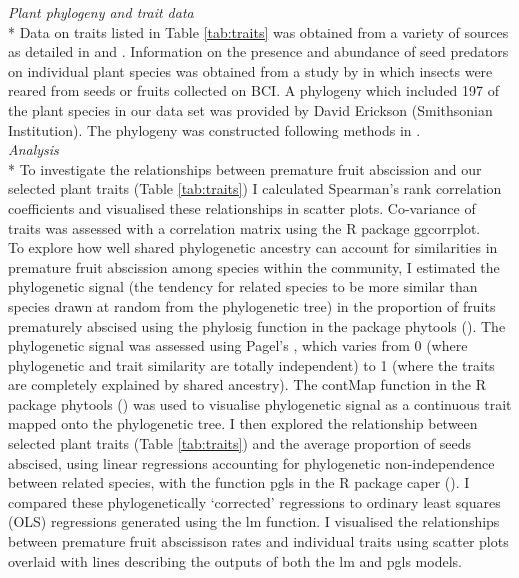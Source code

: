 \emph{Plant phylogeny and trait data}\\*
Data on traits listed in Table \ref{tab:traits} was obtained from a variety of sources as detailed in \cite{gripenbergHighlyResolvedFood2019} and \cite{wrightFunctionalTraitsGrowth2010}. Information on the presence and abundance of seed predators on individual plant species was obtained from a study by \cite{gripenbergHighlyResolvedFood2019} in which insects were reared from seeds or fruits collected on BCI. A phylogeny which included 197 of the plant species in our data set was provided by David Erickson (Smithsonian Institution).  The phylogeny was constructed following methods in \cite{kressPlantDNABarcodes2009}. \\

\emph{Analysis}\\*
To investigate the relationships between premature fruit abscission and our selected plant traits (Table \ref{tab:traits}) I calculated Spearman’s rank correlation coefficients and visualised these relationships in scatter plots. Co-variance of traits was assessed with a correlation matrix using the R package ggcorrplot.\\

To explore how well shared phylogenetic ancestry can account for similarities in premature fruit abscission among species within the community, I estimated the phylogenetic signal (the tendency for related species to be more similar than species drawn at random from the phylogenetic tree) in the proportion of fruits prematurely abscised using the phylosig function in the package phytools (\cite{revellPhytoolsPhylogeneticTools2020}). The phylogenetic signal was assessed using Pagel’s \textlambda, which varies from 0 (where phylogenetic and trait similarity are totally independent) to 1 (where the traits are completely explained by shared ancestry). The contMap function in the R package phytools (\cite{revellPhytoolsPhylogeneticTools2020}) was used to visualise phylogenetic signal as a continuous trait mapped onto the phylogenetic tree. I then explored the relationship between selected plant traits (Table \ref{tab:traits}) and the average proportion of seeds abscised, using linear regressions accounting for phylogenetic non-independence between related species, with the function pgls in the R package caper (\cite{ormeCaperComparativeAnalyses2018}). I compared these phylogenetically ‘corrected’ regressions to ordinary least squares (OLS) regressions generated using the lm function. I visualised the relationships between premature fruit abscissison rates and individual traits using scatter plots overlaid with lines describing the outputs of both the lm and pgls models.\\

